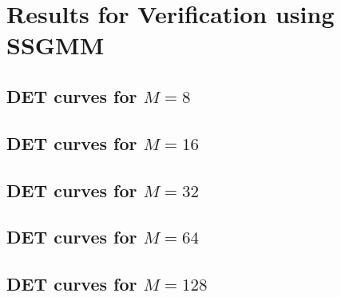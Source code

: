 \chapter{Results for Verification using SSGMM}
\label{apx:results-verify-ssgmm}



\section{DET curves for $M = 8$}

\section{DET curves for $M = 16$}

\section{DET curves for $M = 32$}

\section{DET curves for $M = 64$}

\section{DET curves for $M = 128$}